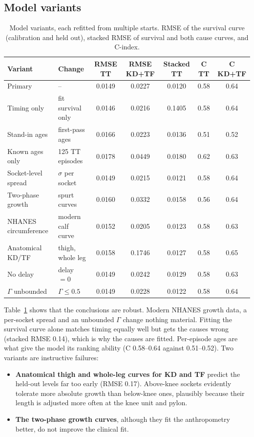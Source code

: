 \documentclass[11pt]{article}
\theoremstyle{definition}
\begin{document}
\subsection{Model variants}
\begin{table}[htbp]
\centering\footnotesize
\caption{Model variants, each refitted from multiple starts. RMSE of the survival curve (calibration and held out), stacked RMSE of survival and both cause curves, and C-index.}
\label{tab:variants}
\setlength{\tabcolsep}{4pt}
\begin{tabular}{@{}llccccc@{}}
\toprule
Variant & Change & RMSE TT & RMSE KD+TF & Stacked TT & C TT & C KD+TF\\
\midrule
Primary & -- & 0.0149 & 0.0227 & 0.0120 & 0.58 & 0.64\\
Timing only & fit survival only & 0.0146 & 0.0216 & 0.1405 & 0.58 & 0.64\\
Stand-in ages & first-pass ages & 0.0166 & 0.0223 & 0.0136 & 0.51 & 0.52\\
Known ages only & 125 TT episodes & 0.0178 & 0.0449 & 0.0180 & 0.62 & 0.63\\
Socket-level spread & $\sigma$ per socket & 0.0149 & 0.0215 & 0.0121 & 0.58 & 0.64\\
Two-phase growth & spurt curves & 0.0160 & 0.0332 & 0.0158 & 0.56 & 0.64\\
NHANES circumference & modern calf curve & 0.0152 & 0.0205 & 0.0123 & 0.58 & 0.63\\
Anatomical KD/TF & thigh, whole leg & 0.0158 & 0.1746 & 0.0127 & 0.58 & 0.65\\
No delay & delay $=0$ & 0.0149 & 0.0242 & 0.0129 & 0.58 & 0.63\\
$\Gamma$ unbounded & $\Gamma\le0.5$ & 0.0149 & 0.0228 & 0.0122 & 0.58 & 0.64\\
\bottomrule
\end{tabular}
\end{table}
Table~\ref{tab:variants} shows that the conclusions are robust. Modern NHANES growth data, a per-socket spread and an unbounded $\Gamma$ change nothing material. Fitting the survival curve alone matches timing equally well but gets the causes wrong (stacked RMSE 0.14), which is why the causes are fitted. Per-episode ages are what give the model its ranking ability (C 0.58--0.64 against 0.51--0.52). Two variants are instructive failures:
\begin{itemize}[leftmargin=1.4em,itemsep=1pt]
\item \textbf{Anatomical thigh and whole-leg curves for KD and TF} predict the held-out levels far too early (RMSE 0.17). Above-knee sockets evidently tolerate more absolute growth than below-knee ones, plausibly because their length is adjusted more often at the knee unit and pylon.
\item \textbf{The two-phase growth curves}, although they fit the anthropometry better, do not improve the clinical fit.
\end{itemize}
\end{document}
